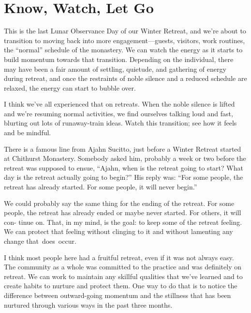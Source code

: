 
\chapter{Know, Watch, Let Go}

This is the last Lunar Observance Day of our Winter Retreat, and we're about to transition to moving \linebreak back into more engagement---guests, visitors, work routines, the ``normal'' schedule of the monastery. We can watch the energy as it starts to build momentum towards that transition. Depending on the individual, there may have been a fair amount of settling, quietude, and gathering of energy during retreat, and once the restraints of noble silence and a reduced schedule are relaxed, the energy can start to bubble over.

I think we've all experienced that on retreats. When the noble silence is lifted and we're resuming normal activities, we find ourselves talking loud and fast, blurting out lots of runaway-train ideas. Watch this transition; see how it feels and be mindful.

There is a famous line from Ajahn Sucitto, just before \linebreak a Winter Retreat started at Chithurst Monastery. \mbox{Somebody} asked him, probably a week or two before \linebreak the retreat was supposed to ensue, ``Ajahn, when is the retreat going to start? What day is the retreat actually going to begin?'' His reply was: ``For some people, the retreat has already started. For some people, it will never begin.''

We could probably say the same thing for the ending of the retreat. For some people, the retreat has already ended or maybe never started. For others, it will con- \linebreak tinue on. That, in my mind, is the goal: to keep some of the retreat feeling. We can protect that feeling without clinging to it and without lamenting any change \mbox{that does occur.}

I think most people here had a fruitful retreat, even if it was not always easy. The community as a whole was committed to the practice and was definitely on retreat. We can work to maintain any skillful qualities that we've learned and to create habits to nurture and protect them. One way to do that is to notice the difference between outward-going momentum and the stillness that has been nurtured through various ways in the past three months.

